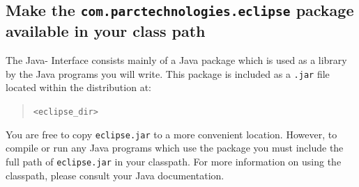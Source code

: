 \subsection{Make the {\tt com.parctechnologies.eclipse} package available in your class path}
The Java-{\eclipse} Interface consists mainly of a Java package which is
used as a library by the Java programs you will write. This package is
included as a {\tt .jar} file located within the {\eclipse} distribution at:
\begin{quote}
{\tt <eclipse\_dir>}\jarlocation
\end{quote}
You are free to copy {\tt eclipse.jar} to a more convenient
location. However, to compile or run any Java programs which use the
package you must include the full path of {\tt eclipse.jar} in your
classpath. For more information on using the classpath, please consult
your Java documentation.




